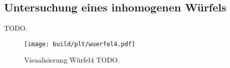 \subsection{Untersuchung eines inhomogenen Würfels}

\begin{table}[H]
    \centering
    \caption{TODO.}
    \label{tab:auswertung:wuerfel4}
\end{table}

\begin{figure}
    \centering
    \texttt{[image: build/plt/wuerfel4.pdf]}
    \caption{Visualisierung Würfel4 TODO.}
    \label{plt:auswertung:wuerfel4}
\end{figure}
